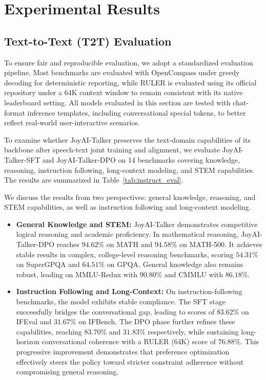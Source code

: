 
 
\section{Experimental Results}
\subsection{Text-to-Text (T2T) Evaluation}
To ensure fair and reproducible evaluation, we adopt a standardized evaluation pipeline. Most benchmarks are evaluated with OpenCompass under greedy decoding for deterministic reporting, while RULER is evaluated using its official repository under a 64K context window to remain consistent with its native leaderboard setting. All models evaluated in this section are tested with chat-format inference templates, including conversational special tokens, to better reflect real-world user-interactive scenarios.

To examine whether JoyAI-Talker preserves the text-domain capabilities of its backbone after speech-text joint training and alignment, we evaluate JoyAI-Talker-SFT and JoyAI-Talker-DPO on 14 benchmarks covering knowledge, reasoning, instruction following, long-context modeling, and STEM capabilities. The results are summarized in Table~\ref{tab:instruct_eval}.

We discuss the results from two perspectives: general knowledge, reasoning, and STEM capabilities, as well as instruction following and long-context modeling.


\begin{itemize}
    \item \textbf{General Knowledge and STEM:} JoyAI-Talker demonstrates competitive logical reasoning and academic proficiency. In mathematical reasoning, JoyAI-Talker-DPO reaches $94.62\%$ on MATH and $94.58\%$ on MATH-500. It achieves stable results in complex, college-level reasoning benchmarks, scoring $54.31\%$ on SuperGPQA and $64.51\%$ on GPQA. General knowledge also remains robust, leading on MMLU-Redux with $90.80\%$ and CMMLU with $86.18\%$.
    
    \item \textbf{Instruction Following and Long-Context:} On instruction-following benchmarks, the model exhibits stable compliance. The SFT stage successfully bridges the conversational gap, leading to scores of $83.62\%$ on IFEval and $31.67\%$ on IFBench. The DPO phase further refines these capabilities, reaching $83.70\%$ and $31.83\%$ respectively, while sustaining long-horizon conversational coherence with a RULER (64K) score of $76.88\%$. This progressive improvement demonstrates that preference optimization effectively steers the policy toward stricter constraint adherence without compromising general reasoning.
\end{itemize}

